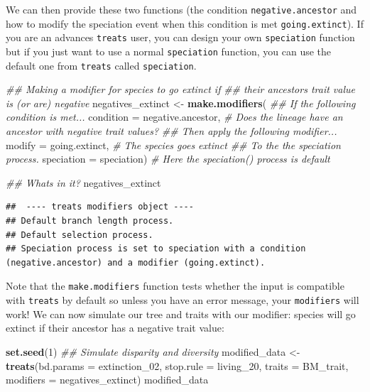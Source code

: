 \documentclass[
]{book}
\newenvironment{Shaded}{\begin{snugshade}}{\end{snugshade}}
\newcommand{\CommentTok}[1]{\textcolor[rgb]{0.56,0.35,0.01}{\textit{#1}}}
\newcommand{\DataTypeTok}[1]{\textcolor[rgb]{0.13,0.29,0.53}{#1}}
\newcommand{\DecValTok}[1]{\textcolor[rgb]{0.00,0.00,0.81}{#1}}
\newcommand{\KeywordTok}[1]{\textcolor[rgb]{0.13,0.29,0.53}{\textbf{#1}}}
\newcommand{\NormalTok}[1]{#1}
\newcommand{\StringTok}[1]{\textcolor[rgb]{0.31,0.60,0.02}{#1}}
\begin{document}
We can then provide these two functions (the condition \texttt{negative.ancestor} and how to modify the speciation event when this condition is met \texttt{going.extinct}).
If you are an advances \texttt{treats} user, you can design your own \texttt{speciation} function but if you just want to use a normal \texttt{speciation} function, you can use the default one from \texttt{treats} called \texttt{speciation}.

\begin{Shaded}
\begin{Highlighting}[]
\CommentTok{\#\# Making a modifier for species to go extinct if}
\CommentTok{\#\# their ancestor\textquotesingle{}s trait value is (or are) negative}
\NormalTok{negatives\_extinct \textless{}{-}}\StringTok{ }\KeywordTok{make.modifiers}\NormalTok{(}
            \CommentTok{\#\# If the following condition is met...}
            \DataTypeTok{condition =}\NormalTok{ negative.ancestor, }\CommentTok{\# Does the lineage have an ancestor with negative trait values?}
            \CommentTok{\#\# Then apply the following modifier...}
            \DataTypeTok{modify =}\NormalTok{ going.extinct, }\CommentTok{\# The species goes extinct}
            \CommentTok{\#\# To the the speciation process.}
            \DataTypeTok{speciation =}\NormalTok{ speciation) }\CommentTok{\# Here the speciation() process is default}

\CommentTok{\#\# What\textquotesingle{}s in it?}
\NormalTok{negatives\_extinct}
\end{Highlighting}
\end{Shaded}

\begin{verbatim}
##  ---- treats modifiers object ---- 
## Default branch length process.
## Default selection process.
## Speciation process is set to speciation with a condition (negative.ancestor) and a modifier (going.extinct).
\end{verbatim}

Note that the \texttt{make.modifiers} function tests whether the input is compatible with \texttt{treats} by default so unless you have an error message, your \texttt{modifiers} will work!
We can now simulate our tree and traits with our modifier: species will go extinct if their ancestor has a negative trait value:

\begin{Shaded}
\begin{Highlighting}[]
\KeywordTok{set.seed}\NormalTok{(}\DecValTok{1}\NormalTok{)}
\CommentTok{\#\# Simulate disparity and diversity}
\NormalTok{modified\_data \textless{}{-}}\StringTok{ }\KeywordTok{treats}\NormalTok{(}\DataTypeTok{bd.params =}\NormalTok{ extinction\_}\DecValTok{02}\NormalTok{,}
                        \DataTypeTok{stop.rule =}\NormalTok{ living\_}\DecValTok{20}\NormalTok{,}
                        \DataTypeTok{traits    =}\NormalTok{ BM\_trait,}
                        \DataTypeTok{modifiers =}\NormalTok{ negatives\_extinct)}
\NormalTok{modified\_data}
\end{Highlighting}
\end{Shaded}
\end{document}
